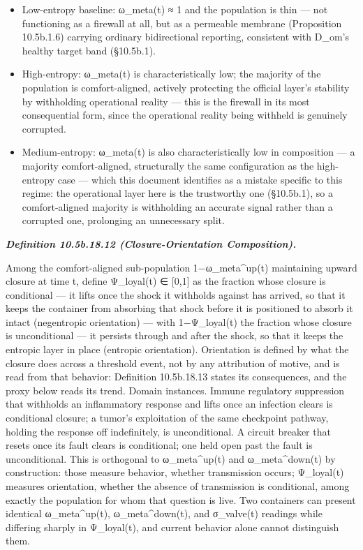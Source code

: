 \documentclass[
]{article}
\begin{document}
\begin{itemize}
\item
  Low-entropy baseline: ω\_meta(t) ≈ 1 and the population is thin ---
  not functioning as a firewall at all, but as a permeable membrane
  (Proposition 10.5b.1.6) carrying ordinary bidirectional reporting,
  consistent with D\_om's healthy target band (§10.5b.1).
\item
  High-entropy: ω\_meta(t) is characteristically low; the majority of
  the population is comfort-aligned, actively protecting the official
  layer's stability by withholding operational reality --- this is the
  firewall in its most consequential form, since the operational reality
  being withheld is genuinely corrupted.
\item
  Medium-entropy: ω\_meta(t) is also characteristically low in
  composition --- a majority comfort-aligned, structurally the same
  configuration as the high-entropy case --- which this document
  identifies as a mistake specific to this regime: the operational layer
  here is the trustworthy one (§10.5b.1), so a comfort-aligned majority
  is withholding an accurate signal rather than a corrupted one,
  prolonging an unnecessary split.
\end{itemize}

\emph{\textbf{Definition 10.5b.18.12 (Closure-Orientation
Composition).}}

Among the comfort-aligned sub-population 1−ω\_meta\^{}up(t) maintaining
upward closure at time t, define Ψ\_loyal(t) ∈ {[}0,1{]} as the fraction
whose closure is conditional --- it lifts once the shock it withholds
against has arrived, so that it keeps the container from absorbing that
shock before it is positioned to absorb it intact (negentropic
orientation) --- with 1−Ψ\_loyal(t) the fraction whose closure is
unconditional --- it persists through and after the shock, so that it
keeps the entropic layer in place (entropic orientation). Orientation is
defined by what the closure does across a threshold event, not by any
attribution of motive, and is read from that behavior: Definition
10.5b.18.13 states its consequences, and the proxy below reads its
trend. Domain instances. Immune regulatory suppression that withholds an
inflammatory response and lifts once an infection clears is conditional
closure; a tumor's exploitation of the same checkpoint pathway, holding
the response off indefinitely, is unconditional. A circuit breaker that
resets once its fault clears is conditional; one held open past the
fault is unconditional. This is orthogonal to ω\_meta\^{}up(t) and
ω\_meta\^{}down(t) by construction: those measure behavior, whether
transmission occurs; Ψ\_loyal(t) measures orientation, whether the
absence of transmission is conditional, among exactly the population for
whom that question is live. Two containers can present identical
ω\_meta\^{}up(t), ω\_meta\^{}down(t), and σ\_valve(t) readings while
differing sharply in Ψ\_loyal(t), and current behavior alone cannot
distinguish them.
\end{document}
